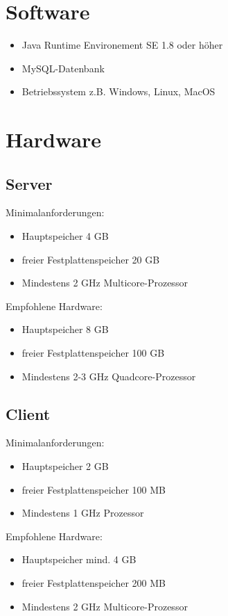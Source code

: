 \section{Software}
   \begin{itemize}
      \item Java Runtime Environement SE 1.8 oder höher
      \item MySQL-Datenbank
      \item Betriebssystem z.B. Windows, Linux, MacOS
   \end{itemize}
\section{Hardware}
\label{sec:empfohleneHardware}
   \subsection{Server}
	Minimalanforderungen:
   \begin{itemize}
      \item Hauptspeicher 4 GB
      \item freier Festplattenspeicher 20 GB
      \item Mindestens 2 GHz Multicore-Prozessor
   \end{itemize}
   Empfohlene Hardware:
   \begin{itemize}
      \item Hauptspeicher 8 GB
      \item freier Festplattenspeicher 100 GB
      \item Mindestens 2-3 GHz Quadcore-Prozessor
   \end{itemize}
   \subsection{Client}\label{subsec:speicherClient}
   	Minimalanforderungen:
   \begin{itemize}
      \item Hauptspeicher 2 GB
      \item freier Festplattenspeicher 100 MB
      \item Mindestens 1 GHz Prozessor
   \end{itemize}
   Empfohlene Hardware:
   \begin{itemize}
      \item Hauptspeicher mind. 4 GB
      \item freier Festplattenspeicher 200 MB
      \item Mindestens 2 GHz Multicore-Prozessor
   \end{itemize}

